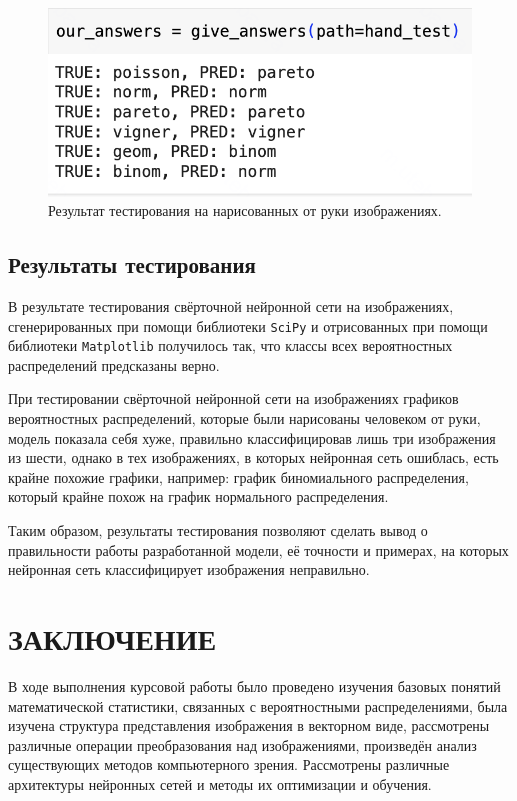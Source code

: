 \documentclass[14pt, russian]{scrartcl}
\newcommand{\anonsection}[1]{\cleardoublepage
\phantomsection %
\addcontentsline{toc}{section}{\protect\numberline{}#1}
\section*{#1}\vspace*{2.5ex} %
}
\begin{document}
\begin{figure}[H]
	\centering
	\begin{minipage}[t]{.5\textwidth}
		\centering
		\includegraphics[width=\linewidth]{./img/hand_res.png}
	\end{minipage}
	\caption{Результат тестирования на нарисованных от руки изображениях.}
	\label{fig:hand_res}
\end{figure}

\subsection{Результаты тестирования}
В результате тестирования свёрточной нейронной сети на изображениях, сгенерированных при помощи библиотеки \verb|SciPy| и отрисованных при помощи библиотеки \verb|Matplotlib| получилось так, что классы всех вероятностных распределений предсказаны верно.

При тестировании свёрточной нейронной сети на изображениях графиков вероятностных распределений, которые были нарисованы человеком от руки, модель показала себя хуже, правильно классифицировав лишь три изображения из шести, однако в тех изображениях, в которых нейронная сеть ошиблась, есть крайне похожие графики, например: график биномиального распределения, который крайне похож на график нормального распределения. 

Таким образом, результаты тестирования позволяют сделать вывод о правильности работы разработанной модели, её точности и примерах, на которых нейронная сеть классифицирует изображения неправильно.

\newpage
\anonsection{ЗАКЛЮЧЕНИЕ}
В ходе выполнения курсовой работы было проведено изучения базовых понятий математической статистики, связанных с вероятностными распределениями, была изучена структура представления изображения в векторном виде, рассмотрены различные операции преобразования над изображениями, произведён анализ существующих методов компьютерного зрения. Рассмотрены различные архитектуры нейронных сетей и методы их оптимизации и обучения.
\end{document}
